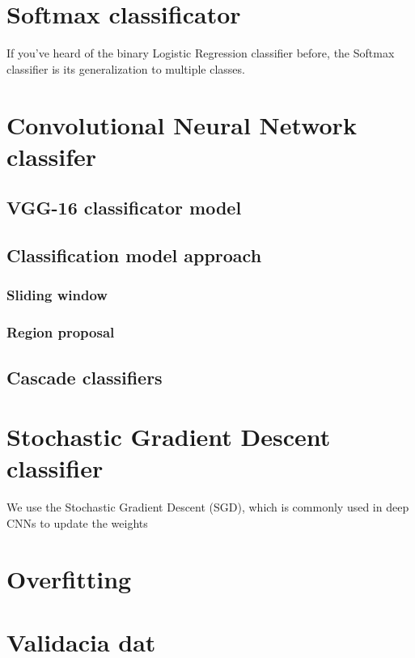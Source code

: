 \documentclass[10pt,a4paper]{article}
\begin{document}
\section{Softmax classificator}
If you’ve heard of the binary Logistic Regression classifier before, the Softmax classifier is its generalization to multiple classes.



\section{Convolutional Neural Network classifer}

\subsection{VGG-16 classificator model}

\subsection{Classification model approach}

\subsubsection{Sliding window}

\subsubsection{Region proposal}

\subsection{Cascade classifiers}



\section{Stochastic Gradient Descent classifier}
We use the Stochastic Gradient Descent (SGD),
which is commonly used in deep CNNs to update the weights



\section{Overfitting}




\section{Validacia dat}
\end{document}
